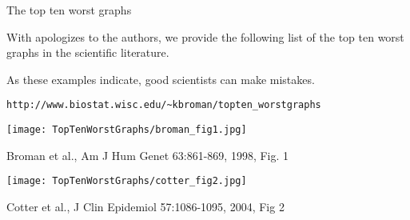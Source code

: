 \documentclass[12pt]{article}
\newcommand{\headsize}{\fontsize{35}{35} \selectfont}
\newcommand{\smallsize}{\fontsize{25}{30} \selectfont}
\newcommand{\smallersize}{\fontsize{20}{25} \selectfont}
\newcommand{\smallestsize}{\fontsize{18}{22} \selectfont}
\begin{document}
\newpage

\headsize \color{myyellow}
\hfill \begin{minipage}{5.75in}
\centering
The top ten worst graphs
\end{minipage}

\vspace{30mm}
\smallsize \color{mywhite}

\hspace{0.5in} \begin{minipage}{9in}

\setlength{\rightskip}{0pt plus 1fil} %

With apologizes to the authors, we provide the following list of the
top ten worst graphs in the scientific literature.

\vspace{15mm}

As these examples indicate, good scientists can make mistakes.

\vspace{35mm}

\hfill \color{myblue} \smallersize
\verb|http://www.biostat.wisc.edu/~kbroman/topten_worstgraphs|

\end{minipage}

\newpage


\headsize \color{myyellow}
\hfill \begin{minipage}{5.75in}
\end{minipage}

\vspace{30mm}

\centerline{\texttt{[image: TopTenWorstGraphs/broman\_fig1.jpg]}}

\vfill \hfill \smallestsize \color{myblue}
Broman et al., Am J Hum Genet 63:861-869, 1998, Fig. 1

\newpage


\headsize \color{myyellow}
\hfill \begin{minipage}{5.75in}
\end{minipage}

\vspace{30mm}

\centerline{\texttt{[image: TopTenWorstGraphs/cotter\_fig2.jpg]}}

\vfill \hfill \smallestsize \color{myblue}
Cotter et al., J Clin Epidemiol 57:1086-1095, 2004, Fig 2

\newpage
\end{document}
